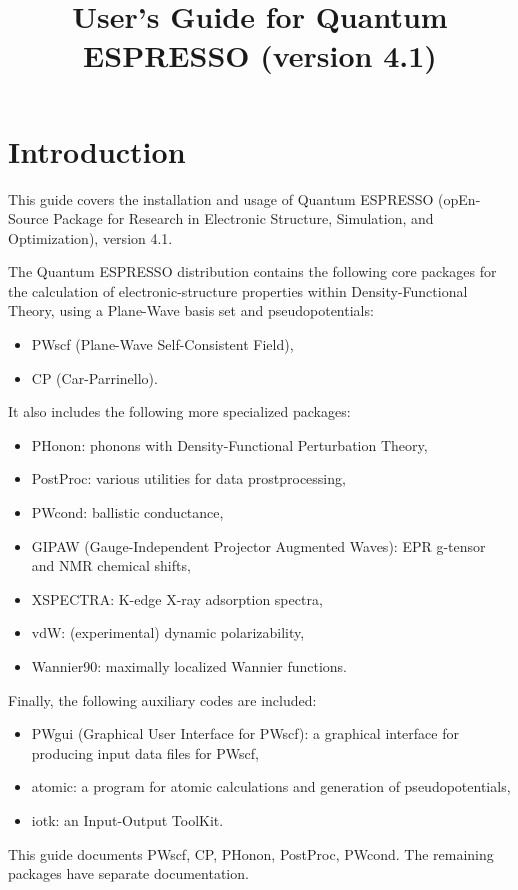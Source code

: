 \documentclass[12pt,a4paper]{article}
\def\version{4.1}
\begin{document}
 
\author{}
\date{}
\title{
 \hskip 2cm
 \vskip 2cm
  \huge User's Guide for Quantum ESPRESSO \smallskip
  \Large (version \version)
}
\maketitle

\tableofcontents

\section{Introduction}

This guide covers the installation and usage of Quantum ESPRESSO
(opEn-Source Package for Research in Electronic Structure, Simulation,
and Optimization), version \version.

The Quantum ESPRESSO distribution contains the following core packages 
for the calculation of electronic-structure properties within
Density-Functional Theory, using a Plane-Wave basis set and pseudopotentials:
\begin{itemize}
  \item PWscf (Plane-Wave Self-Consistent Field),
  \item CP (Car-Parrinello).
\end{itemize}
It also includes the following more specialized packages:
\begin{itemize}
  \item PHonon:
        phonons with Density-Functional Perturbation Theory,
  \item PostProc: various utilities for data prostprocessing,
  \item PWcond:
        ballistic conductance,
  \item GIPAW  (Gauge-Independent Projector Augmented Waves):
        EPR g-tensor and NMR chemical shifts,
  \item XSPECTRA:
        K-edge X-ray adsorption spectra,
  \item vdW:
        (experimental) dynamic polarizability, 
  \item Wannier90:
        maximally localized Wannier functions.
\end{itemize}
Finally, the following auxiliary codes are included:
\begin{itemize}
\item PWgui (Graphical User Interface for PWscf): 
      a graphical interface for producing input data files for PWscf,
\item atomic: 
      a program for atomic calculations and generation of pseudopotentials,
\item iotk:
      an Input-Output ToolKit.
\end{itemize}
This guide documents PWscf, CP, PHonon, PostProc, PWcond. 
The remaining packages have separate documentation.
\end{document}
